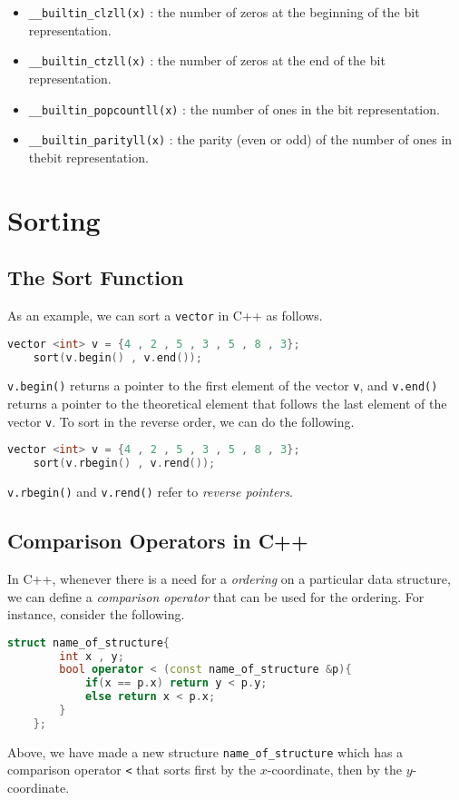 \documentclass[12pt,a4paper]{amsart}
\numberwithin{equation}{section}
\theoremstyle{definition}
\begin{document}
\begin{itemize}
    \item \verb|__builtin_clzll(x)| : the number of zeros at the beginning of the bit representation.
    \item \verb|__builtin_ctzll(x)| : the number of zeros at the end of the bit representation.
    \item \verb|__builtin_popcountll(x)| : the number of ones in the bit representation.
    \item \verb|__builtin_parityll(x)| : the parity (even or odd) of the number of ones in thebit representation.
\end{itemize}

\section{Sorting}
\subsection{The Sort Function} As an example, we can sort a \verb|vector| in C++ as follows. 
\begin{lstlisting}[language=C++]
    vector <int> v = {4 , 2 , 5 , 3 , 5 , 8 , 3};
    sort(v.begin() , v.end());
\end{lstlisting}
\verb|v.begin()| returns a pointer to the first element of the vector \verb|v|, and \verb|v.end()| returns a pointer to the theoretical element that follows the last element of the vector \verb|v|. To sort in the reverse order, we can do the following. 
\begin{lstlisting}[language=C++]
    vector <int> v = {4 , 2 , 5 , 3 , 5 , 8 , 3};
    sort(v.rbegin() , v.rend());
\end{lstlisting}
\verb|v.rbegin()| and \verb|v.rend()| refer to \textit{reverse pointers}. 

\subsection{Comparison Operators in C++} In C++, whenever there is a need for a \textit{ordering} on a particular data structure, we can define a \textit{comparison operator} that can be used for the ordering. For instance, consider the following. 
\begin{lstlisting}[language=C++]
    struct name_of_structure{
        int x , y;
        bool operator < (const name_of_structure &p){
            if(x == p.x) return y < p.y;
            else return x < p.x;
        }
    };
\end{lstlisting}
Above, we have made a new structure \verb|name_of_structure| which has a comparison operator \verb|<| that sorts first by the $x$-coordinate, then by the $y$-coordinate.
\end{document}
